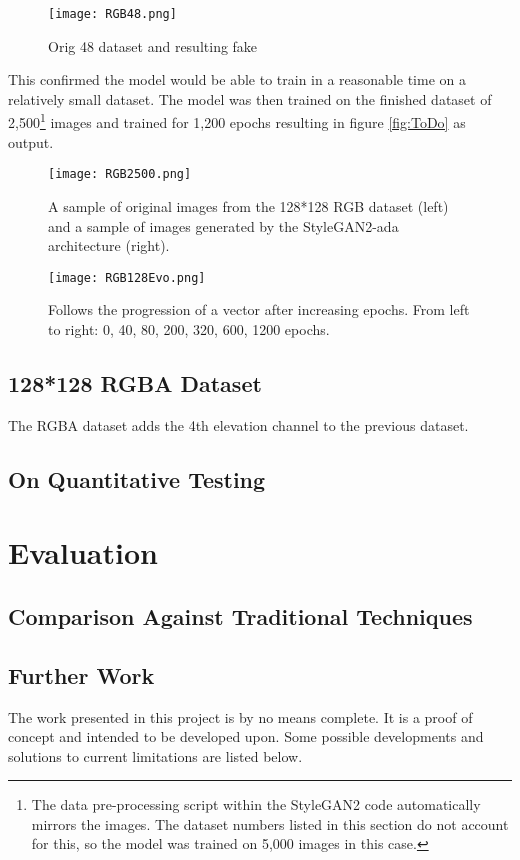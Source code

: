 \documentclass[a4paper]{report}
\begin{document}
\begin{figure}[H]
    \centering
        \texttt{[image: RGB48.png]}
        \caption{Orig 48 dataset and resulting fake}
        \label{fig:RGB48}
\end{figure}

This confirmed the model would be able to train in a reasonable time on a relatively small dataset. The model was then trained on the finished dataset of 2,500\footnote{The data pre-processing script within the StyleGAN2 code automatically mirrors the images. The dataset numbers listed in this section do not account for this, so the model was trained on 5,000 images in this case.} images and trained for 1,200 epochs resulting in figure \ref{fig:ToDo} as output.

\begin{figure}[H]
    \centering
        \texttt{[image: RGB2500.png]}
        \caption{A sample of original images from the 128*128 RGB dataset (left) and a sample of images generated by the StyleGAN2-ada architecture (right).}
        \label{fig:RGB2500}
\end{figure}

\begin{figure}[H]
    \centering
        \texttt{[image: RGB128Evo.png]}
        \caption{Follows the progression of a vector after increasing epochs. From left to right: 0, 40, 80, 200, 320, 600, 1200 epochs.}
        \label{fig:RGB2500Evo}
\end{figure}

\subsection{128*128 RGBA Dataset}
The RGBA dataset adds the 4th elevation channel to the previous dataset. 
\subsection{On Quantitative Testing}
\section{Evaluation}
\subsection{Comparison Against Traditional Techniques}
\subsection{Further Work}
The work presented in this project is by no means complete. It is a proof of concept and intended to be developed upon. Some possible developments and solutions to current limitations are listed below.
\end{document}
